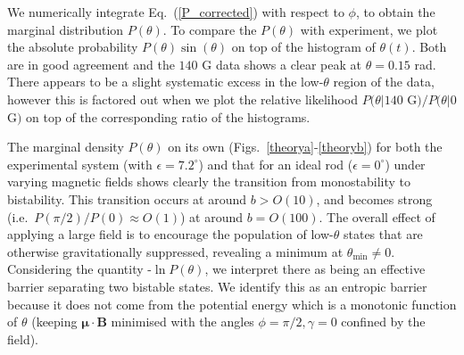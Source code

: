 \documentclass[aps,prl,reprint,twocolumn,superscriptaddress,showpacs]{revtex4-1}
\newcommand{\vcrm}[1]{\mathbf{#1}}
\newcommand{\vc}[1]{\boldsymbol{#1}}
\begin{document}
We numerically integrate Eq.\ (\ref{P_corrected}) with respect to $\phi$, to obtain the marginal distribution $P(\theta)$. To compare the $P(\theta)$ with experiment, we plot the absolute probability $P(\theta)\sin(\theta)$ on top of the histogram of $\theta(t)$. Both are in good agreement and the $140$ G data shows a clear peak at $\theta=0.15$ rad. There appears to be a slight systematic excess in the low-$\theta$ region of the data, however this is factored out when we plot the relative likelihood $P(\theta | 140$ G$)/P(\theta | 0$ G$)$ on top of the corresponding ratio of the histograms. 

The marginal density $P(\theta)$ on its own (Figs.\ \ref{theorya}-\ref{theoryb}) for both the experimental system (with $\epsilon=7.2^\circ$) and that for an ideal rod ($\epsilon=0^\circ$) under varying magnetic fields shows clearly the transition from monostability to bistability. This transition occurs at around $b > O(10)$, and becomes strong (i.e.\ $P(\pi/2)/P(0) \approx O(1)$) at around $b=O(100)$. The overall effect of applying a large field is to encourage the population of low-$\theta$ states that are otherwise gravitationally suppressed, revealing a minimum at $\theta_{\text{min}}\ne 0$. Considering the quantity -$\ln P(\theta)$, we interpret there as being an effective barrier separating two bistable states. We identify this as an entropic barrier because it does not come from the potential energy which is a monotonic function of $\theta$ (keeping $\vc{\mu}\cdot\vcrm{B}$ minimised with the angles $\phi=\pi/2,\gamma=0$ confined by the field).
\end{document}
